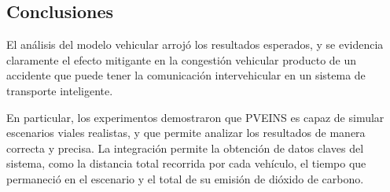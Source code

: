 \subsection{Conclusiones}

El análisis del modelo vehicular arrojó los resultados esperados, y se evidencia claramente el efecto mitigante en la congestión vehicular producto de un accidente que puede tener la comunicación intervehicular en un sistema de transporte inteligente. 

En particular, los experimentos demostraron que PVEINS es capaz de simular escenarios viales realistas, y que permite analizar los resultados de manera correcta y precisa. La integración permite la obtención de datos claves del sistema, como la distancia total recorrida por cada vehículo, el tiempo que permaneció en el escenario y el total de su emisión de dióxido de carbono. 


